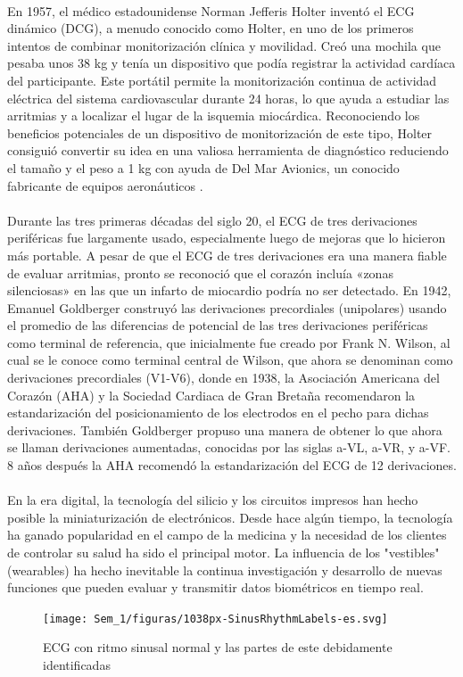 \documentclass[12pt,letterpaper,oneside,openright]{book}
\begin{document}
    \\
    En 1957, el médico estadounidense Norman Jefferis Holter inventó el ECG dinámico (DCG), a menudo conocido como Holter, en uno de los primeros intentos de combinar monitorización clínica y movilidad. Creó una mochila que pesaba unos 38 kg y tenía un dispositivo que podía registrar la actividad cardíaca del participante. Este portátil permite la monitorización continua de actividad eléctrica del sistema cardiovascular durante 24 horas, lo que ayuda a estudiar las arritmias y a localizar el lugar de la isquemia miocárdica. Reconociendo los beneficios potenciales de un dispositivo de monitorización de este tipo, Holter consiguió convertir su idea en una valiosa herramienta de diagnóstico reduciendo el tamaño y el peso a 1 kg con ayuda de Del Mar Avionics, un conocido fabricante de equipos aeronáuticos \cite{vincent2022}.\\
    \\
    Durante las tres primeras décadas del siglo 20, el ECG de tres derivaciones periféricas fue largamente usado, especialmente luego de mejoras que lo hicieron más portable. A pesar de que el ECG de tres derivaciones era una manera fiable de evaluar arritmias, pronto se reconoció que el corazón incluía «zonas silenciosas» en las que un infarto de miocardio podría no ser detectado. En 1942, Emanuel Goldberger construyó las derivaciones precordiales (unipolares) usando el promedio de las diferencias de potencial de las tres derivaciones periféricas como terminal de referencia, que inicialmente fue creado por Frank N. Wilson, al cual se le conoce como terminal central de Wilson, que ahora se denominan como derivaciones precordiales (V1-V6), donde en 1938, la Asociación Americana del Corazón (AHA) y la Sociedad Cardiaca de Gran Bretaña recomendaron la estandarización del posicionamiento de los electrodos en el pecho para dichas derivaciones. También Goldberger propuso una manera de obtener lo que ahora se llaman derivaciones aumentadas, conocidas por las siglas a-VL, a-VR, y a-VF. 8 años después la AHA recomendó la estandarización del ECG de 12 derivaciones. \cite{vincent2022}\\
    \\
    En la era digital, la tecnología del silicio y los circuitos impresos han hecho posible la miniaturización de electrónicos. Desde hace algún tiempo, la tecnología ha ganado popularidad en el campo de la medicina y la necesidad de los clientes de controlar su salud ha sido el principal motor. La influencia de los "vestibles" (wearables) ha hecho inevitable la continua investigación y desarrollo de nuevas funciones que pueden evaluar y transmitir datos biométricos en tiempo real. \\ 
    \begin{figure}[h]
    	\centering
    	\texttt{[image: Sem\_1/figuras/1038px-SinusRhythmLabels-es.svg]}
    	\caption{ECG con ritmo sinusal normal y las partes de este debidamente identificadas}
    	\label{fig:ECGSinusal}
    \end{figure}
    \\
    
\end{document}
